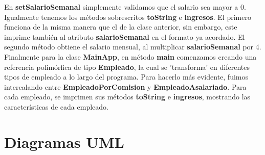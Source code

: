 \documentclass[letterpaper,12pt]{article}
\begin{document}
En \textbf{setSalarioSemanal} simplemente validamos que el salario sea mayor a 0. Igualmente tenemos los métodos sobrescritos \textbf{toString} e \textbf{ingresos}. El primero funciona de la misma manera que el de la clase anterior, sin embargo, este imprime también al atributo \textbf{salarioSemanal} en el formato ya acordado. El segundo método obtiene el salario mensual, al multiplicar \textbf{salarioSemanal} por 4.\\

Finalmente para la clase \textbf{MainApp}, en método \textbf{main} comenzamos creando una referencia polimórfica de tipo \textbf{Empleado}, la cual se 'transforma' en diferentes tipos de empleado a lo largo del programa. Para hacerlo más evidente, fuimos intercalando entre \textbf{EmpleadoPorComision} y \textbf{EmpleadoAsalariado}. Para cada empleado, se imprimen sus métodos \textbf{toString} e \textbf{ingresos}, mostrando las características de cada empleado.  

\section{Diagramas UML}
\end{document}
